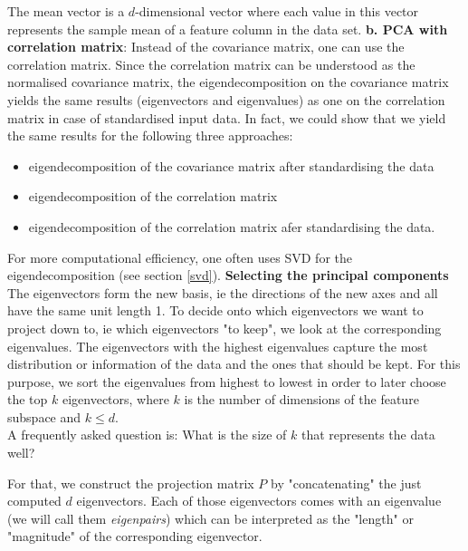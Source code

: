 \documentclass[journal, a4paper]{IEEEtran}
\begin{document}
The mean vector is a \(d\)-dimensional vector where each value in this vector represents the sample mean of a feature column in the data set.
\textbf{b. PCA with correlation matrix}: 
Instead of the covariance matrix, one can use the correlation matrix. 
Since the correlation matrix can be understood as the normalised covariance matrix, the eigendecomposition on the covariance matrix yields the same results (eigenvectors and eigenvalues) as one on the correlation matrix in case of standardised input data. 
In fact, we could show that we yield the same results for the following three approaches:
\begin{itemize}
\item eigendecomposition of the covariance matrix after standardising the data
\item eigendecomposition of the correlation matrix
\item eigendecomposition of the correlation matrix afer standardising the data.
\end{itemize}
For more computational efficiency, one often uses SVD for the eigendecomposition (see section \ref{svd}).
\newline
%
\textbf{Selecting the principal components}\\
The eigenvectors form the new basis, ie the directions of the new axes and all have the same unit length 1. To decide onto which eigenvectors we want to project down to, ie which eigenvectors "to keep", we look at the corresponding eigenvalues. The eigenvectors with the highest eigenvalues capture the most distribution or information of the data and the ones that should be kept. 
For this purpose, we sort the eigenvalues from highest to lowest in order to later choose the top \( k \) eigenvectors, where \( k \) is the number of dimensions of the feature subspace and \( k \leq d \). \\
A frequently asked question is: What is the size of \( k \) that represents the data well?


For that, we construct the projection matrix \( P \) by "concatenating" the just computed \( d \) eigenvectors. Each of those eigenvectors comes with an eigenvalue (we will call them \textit{eigenpairs}) which can be interpreted as the "length" or "magnitude" of the corresponding eigenvector. 
\end{document}
